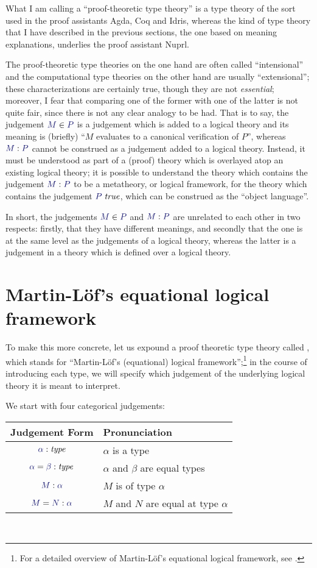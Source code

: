 \documentclass[main.tex]{subfiles}
\begin{document}
What I am calling a ``proof-theoretic type theory'' is a type theory of the
sort used in the proof assistants Agda, Coq and Idris, whereas the kind of
type theory that I have described in the previous sections, the one based on
meaning explanations, underlies the proof assistant Nuprl.

The proof-theoretic type theories on the one hand are often called
``intensional'' and the computational type theories on the other hand are
usually ``extensional''; these characterizations are certainly true, though
they are not \emph{essential}; moreover, I fear that comparing one of the
former with one of the latter is not quite fair, since there is not any clear
analogy to be had. That is to say, the judgement $\ver{M}{P}$ is a judgement
which is added to a logical theory and its meaning is (briefly) ``$M$ evaluates
to a canonical verification of $P$'', whereas $\ofty{M}{P}$ cannot be construed
as a judgement added to a logical theory. Instead, it must be understood as
part of a (proof) theory which is overlayed atop an existing logical theory; it
is possible to understand the theory which contains the judgement $\ofty{M}{P}$
to be a metatheory, or logical framework, for the theory which contains the
judgement $\istrue{P}$, which can be construed as the ``object language''.

In short, the judgements $\ver{M}{P}$ and $\ofty{M}{P}$ are unrelated to each other in
two respects: firstly, that they have different meanings, and secondly that the
one is at the same level as the judgements of a logical theory, whereas the
latter is a judgement in a theory which is defined over a logical theory.

\section{Martin-L\"of's equational logical framework}

To make this more concrete, let us expound a proof theoretic type
theory called \MLLF, which stands for ``Martin-L\"of's (equational) logical
framework'';\footnote{For a detailed overview of Martin-L\"of's equational logical framework, see \cite{PiMLTT}.} in the course of introducing each type, we will specify
which judgement of the underlying logical theory it is meant to
interpret.

We start with four categorical judgements:\\

\begin{tabular}{c|l}
Judgement Form & Pronunciation \\ \hline
  $\type{\alpha}$ & $\alpha$ is a type \\
  $\etype{\alpha}{\beta}$ & $\alpha$ and $\beta$ are equal types \\
  $\ofty{M}{\alpha}$ & $M$ is of type $\alpha$ \\
  $\eofty{M}{N}{\alpha}$ & $M$ and $N$ are equal at type $\alpha$ \\
\end{tabular}\\
\end{document}
